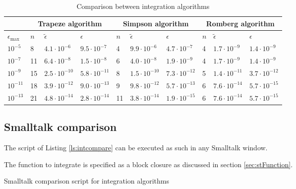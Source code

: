 \begin{table}[h]
  \centering
  \caption{Comparison between integration algorithms}\label{tb:intcompar}
\vspace{1 ex}
\begin{tabular}{|l|l|l|l|l|l|l|l|l|l|} \hline
  &\multicolumn{3}{c|}{\textbf{Trapeze algorithm}} &\multicolumn{3}{c|}{\textbf{Simpson algorithm}}&\multicolumn{3}{c|}{\textbf{Romberg algorithm}}  \\ \hline
  $\epsilon_{\mathop{\textrm{max}}}$ & $n$ & $\tilde{\epsilon}$ & $\epsilon$ & $n$ & $\tilde{\epsilon}$ & $\epsilon$ & $n$ & $\tilde{\epsilon}$ & $\epsilon$
  \\ \hline
$10^{-5}$&8&$4.1\cdot 10^{-6}$&$9.5\cdot 10^{-7}$&4&$9.9\cdot
10^{-6}$&$4.7\cdot 10^{-7}$&4&$1.7\cdot 10^{-9}$&$1.4\cdot
10^{-9}$\\ \hline $10^{-7}$&11&$6.4\cdot 10^{-8}$&$1.5\cdot
10^{-8}$&6&$4.0\cdot 10^{-8}$&$1.9\cdot 10^{-9}$&4&$1.7\cdot
10^{-9}$&$1.4\cdot 10^{-9}$\\ \hline $10^{-9}$ &15&$2.5\cdot
10^{-10}$&$5.8\cdot 10^{-11}$&8&$1.5\cdot 10^{-10}$&$7.3\cdot
10^{-12}$&5&$1.4\cdot 10^{-11}$&$3.7\cdot 10^{-12}$\\ \hline
$10^{-11}$ &18&$3.9\cdot 10^{-12}$&$9.0\cdot 10^{-13}$&9&$9.8\cdot
10^{-12}$&$5.7\cdot 10^{-13}$&6&$7.6\cdot 10^{-14}$&$5.7\cdot
10^{-15}$\\ \hline $10^{-13}$&21&$4.8\cdot 10^{-14}$&$2.8\cdot
10^{-14}$&11&$3.8\cdot 10^{-14}$&$1.9\cdot 10^{-15}$&6&$7.6\cdot
10^{-14}$&$5.7\cdot 10^{-15}$\\ \hline
\end{tabular}
\end{table}


\subsection{Smalltalk comparison}
\label{sec:sintcompar} The script of Listing \ref{ls:intcompare}
can be executed as such in any Smalltalk window.

The function to integrate is specified as a block closure as
discussed in section \ref{sec:stFunction}.
\begin{listing} Smalltalk comparison script for integration algorithms \label{ls:intcompare}

\end{listing}

